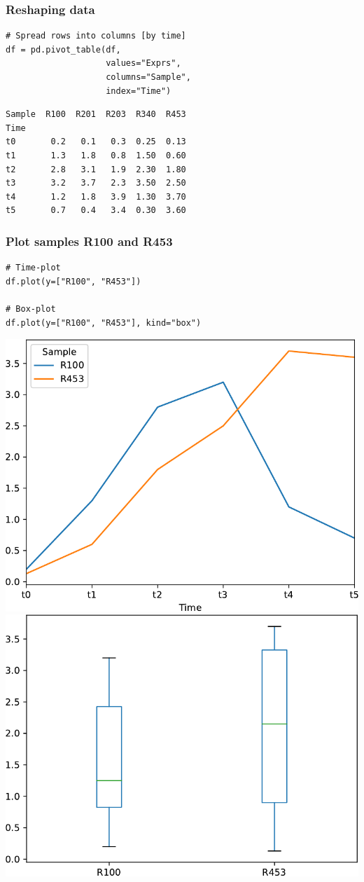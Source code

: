 \documentclass[xcolor=table]{beamer}
\begin{document}
\begin{frame}[fragile]
\frametitle{Reshaping data}

\begin{lstlisting}[style=python]
# Spread rows into columns [by time]
df = pd.pivot_table(df,
                    values="Exprs", 
                    columns="Sample", 
                    index="Time")
\end{lstlisting}

\begin{verbatim}
Sample  R100  R201  R203  R340  R453
Time                                
t0       0.2   0.1   0.3  0.25  0.13
t1       1.3   1.8   0.8  1.50  0.60
t2       2.8   3.1   1.9  2.30  1.80
t3       3.2   3.7   2.3  3.50  2.50
t4       1.2   1.8   3.9  1.30  3.70
t5       0.7   0.4   3.4  0.30  3.60
\end{verbatim}

\end{frame}

\begin{frame}[fragile]
\frametitle{Plot samples R100 and R453}

\begin{lstlisting}[style=python]
# Time-plot
df.plot(y=["R100", "R453"])

# Box-plot
df.plot(y=["R100", "R453"], kind="box")
\end{lstlisting}

\begin{center}
	\includegraphics[width=.48\textwidth]{gene_exprs1.pdf}\hfill
	\includegraphics[width=.48\textwidth]{gene_exprs2.pdf}
\end{center}

\end{frame}
\end{document}
